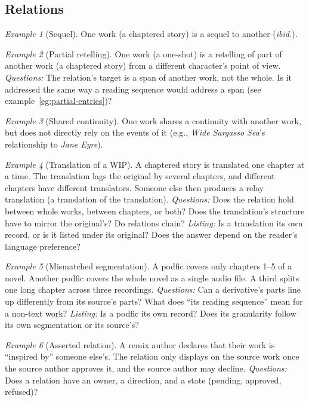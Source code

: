 \documentclass{amsart}
\theoremstyle{remark}
\newtheorem{eg}{Example}
\begin{document}
    \subsection*{Relations}
    \begin{eg}[Sequel]\label{eg:sequel}
        One work (a chaptered story) is a sequel to another (\textit{ibid.}).
    \end{eg}
    \begin{eg}[Partial retelling]\label{eg:pov-retelling}
        One work (a one-shot) is a retelling of part of another work (a chaptered story) from a different character's point of view.
        \emph{Questions:} The relation's target is a span of another work, not the whole. Is it addressed the same way a reading sequence would address a span (see example~\ref{eg:partial-entries})?
    \end{eg}
    \begin{eg}[Shared continuity]\label{eg:continuity}
        One work shares a continuity with another work, but does not directly rely on the events of it (e.g., \textit{Wide Sargasso Sea}'s relationship to \textit{Jane Eyre}).
    \end{eg}
    \begin{eg}[Translation of a WIP]\label{eg:translation}
        A chaptered story is translated one chapter at a time. The translation lags the original by several chapters, and different chapters have different translators. Someone else then produces a relay translation (a translation of the translation).
        \emph{Questions:} Does the relation hold between whole works, between chapters, or both? Does the translation's structure have to mirror the original's? Do relations chain?
        \emph{Listing:} Is a translation its own record, or is it listed under its original? Does the answer depend on the reader's language preference?
    \end{eg}
    \begin{eg}[Mismatched segmentation]\label{eg:podfic}
        A podfic covers only chapters 1--5 of a novel. Another podfic covers the whole novel as a single audio file. A third splits one long chapter across three recordings.
        \emph{Questions:} Can a derivative's parts line up differently from its source's parts? What does ``its reading sequence'' mean for a non-text work?
        \emph{Listing:} Is a podfic its own record? Does its granularity follow its own segmentation or its source's?
    \end{eg}
    \begin{eg}[Asserted relation]\label{eg:consent}
        A remix author declares that their work is ``inspired by'' someone else's. The relation only displays on the source work once the source author approves it, and the source author may decline.
        \emph{Questions:} Does a relation have an owner, a direction, and a state (pending, approved, refused)?
    \end{eg}
\end{document}
